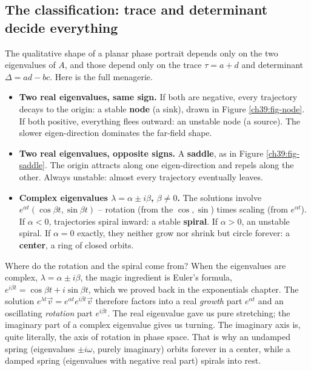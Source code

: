 \subsection{The classification: trace and determinant decide everything}

The qualitative shape of a planar phase portrait depends only on the two
eigenvalues of $A$, and those depend only on the trace $\tau = a+d$ and
determinant $\Delta = ad-bc$. Here is the full menagerie.

\begin{itemize}
\item \textbf{Two real eigenvalues, same sign.} If both are negative, every
trajectory decays to the origin: a stable \textbf{node} (a sink), drawn in
Figure \ref{ch39:fig-node}. If both
positive, everything flees outward: an unstable node (a source). The slower
eigen-direction dominates the far-field shape.

\item \textbf{Two real eigenvalues, opposite signs.} A \textbf{saddle}, as in
Figure \ref{ch39:fig-saddle}. The origin attracts along one eigen-direction and
repels along the other. Always unstable: almost every trajectory eventually
leaves.

\item \textbf{Complex eigenvalues $\lambda = \alpha \pm i\beta$, $\beta\ne0$.}
The solutions involve $e^{\alpha t}(\cos\beta t, \sin\beta t)$ -- rotation
(from the $\cos,\sin$) times scaling (from $e^{\alpha t}$). If $\alpha<0$,
trajectories spiral inward: a stable \textbf{spiral}. If $\alpha>0$, an unstable
spiral. If $\alpha = 0$ exactly, they neither grow nor shrink but circle
forever: a \textbf{center}, a ring of closed orbits.
\end{itemize}

\begin{whybox}
Where do the rotation and the spiral come from? When the eigenvalues are complex,
$\lambda = \alpha \pm i\beta$, the magic ingredient is Euler's formula,
$e^{i\beta t} = \cos\beta t + i\sin\beta t$, which we proved back in the
exponentials chapter. The solution
$e^{\lambda t}\vec v = e^{\alpha t}e^{i\beta t}\vec v$ therefore factors into a
real \emph{growth} part $e^{\alpha t}$ and an oscillating \emph{rotation} part
$e^{i\beta t}$. The real eigenvalue gave us pure stretching; the imaginary part
of a complex eigenvalue gives us turning. The imaginary axis is, quite literally,
the axis of rotation in phase space. That is why an undamped spring (eigenvalues
$\pm i\omega$, purely imaginary) orbits forever in a center, while a damped
spring (eigenvalues with negative real part) spirals into rest.
\end{whybox}

